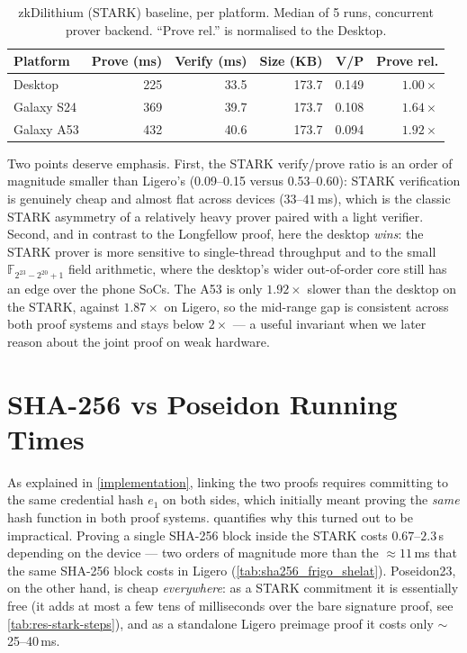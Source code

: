 \documentclass[binding=0.6cm,oneside,noexaminfo]{sapthesis}
\begin{document}
\begin{table}[ht]
  \centering
  \caption{zkDilithium (STARK) baseline, per platform. Median of 5 runs,
  concurrent prover backend. ``Prove rel.'' is normalised to the Desktop.}
  \label{tab:res-base-stark}
  \small
  \begin{tabular}{@{}lrrrrr@{}}
    \toprule
    \textbf{Platform} & \textbf{Prove (ms)} & \textbf{Verify (ms)} & \textbf{Size (KB)} & \textbf{V/P} & \textbf{Prove rel.} \\
    \midrule
    Desktop    & 225 & 33.5 & 173.7 & 0.149 & $1.00\times$ \\
    Galaxy S24 & 369 & 39.7 & 173.7 & 0.108 & $1.64\times$ \\
    Galaxy A53 & 432 & 40.6 & 173.7 & 0.094 & $1.92\times$ \\
    \bottomrule
  \end{tabular}
\end{table}

Two points deserve emphasis. First, the STARK verify/prove ratio is an order of
magnitude smaller than Ligero's (0.09--0.15 versus 0.53--0.60): STARK
verification is genuinely cheap and almost flat across devices ($33$--$41$\,ms),
which is the classic STARK asymmetry of a relatively heavy prover paired with a
light verifier. Second, and in contrast to the Longfellow proof, here the desktop
\emph{wins}: the STARK prover is more sensitive to single-thread throughput and
to the small $\mathbb{F}_{2^{23}-2^{20}+1}$ field arithmetic, where the desktop's
wider out-of-order core still has an edge over the phone SoCs. The A53 is only
$1.92\times$ slower than the desktop on the STARK, against $1.87\times$ on Ligero,
so the mid-range gap is consistent across both proof systems and stays below
$2\times$ --- a useful invariant when we later reason about the joint proof on
weak hardware.

\section{SHA-256 vs Poseidon Running Times}
\label{results:hash}
As explained in \cref{implementation}, linking the two proofs requires committing
to the same credential hash $e_1$ on both sides, which initially meant proving
the \emph{same} hash function in both proof systems. 
quantifies why this turned out to be impractical. Proving a single SHA-256 block
inside the STARK costs $0.67$--$2.3$\,s depending on the device --- two orders of
magnitude more than the ${\approx}11$\,ms that the same SHA-256 block costs in
Ligero (\cref{tab:sha256_frigo_shelat}). Poseidon23, on the other hand, is cheap
\emph{everywhere}: as a STARK commitment it is essentially free (it adds at most
a few tens of milliseconds over the bare signature proof, see
\cref{tab:res-stark-steps}), and as a standalone Ligero preimage proof it costs
only $\sim$25--40\,ms.
\end{document}
